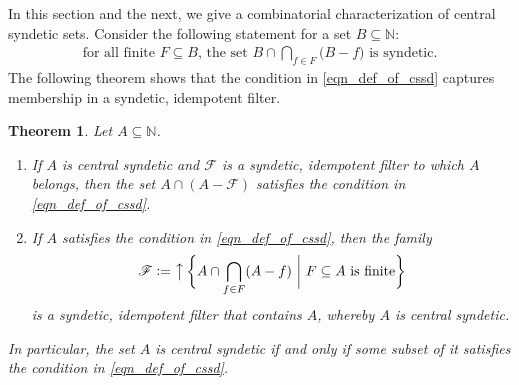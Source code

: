 \documentclass[letter,11pt]{article}
\theoremstyle{plain}
\newtheorem{theorem}{Theorem}
\theoremstyle{definition}
\theoremstyle{plain}
\theoremstyle{plain}
\numberwithin{equation}{section}
\newcommand{\N}{\mathbb{N}}
\newcommand{\defeq}{\vcentcolon=}
\DeclareMathOperator{\bigupclose}{\big\uparrow}
\newcommand{\filter}{\mathscr{F}}
\begin{document}
In this section and the next, we give a combinatorial characterization of central syndetic sets.  Consider the following statement for a set $B \subseteq \N$:
\begin{align}
    \label{eqn_def_of_cssd}
    \text{for all finite $F \subseteq B$, \ the set } B \cap \bigcap_{f \in F} \big( B - f \big) \text{ is syndetic}.
\end{align}
The following theorem shows that the condition in \eqref{eqn_def_of_cssd} captures membership in a syndetic, idempotent filter.


\begin{theorem}
\label{thm_conditions_for_central_syndetic}
    Let $A \subseteq \N$.
    \begin{enumerate}
        \item \label{item_central_syndetic_implies_comb_condition}
        If $A$ is central syndetic and $\filter$ is a syndetic, idempotent filter to which $A$ belongs, then the set $A \cap (A-\filter)$ satisfies the condition in \eqref{eqn_def_of_cssd}.

        \item \label{item_comb_condition_implies_central_syndetic}
        If $A$ satisfies the condition in \eqref{eqn_def_of_cssd}, then the family
        \[\filter \defeq \bigupclose \bigg\{ A \cap \bigcap_{f \in F} (A - f) \ \bigg | \ F \subseteq A \text{ is finite} \bigg\}\]
        is a syndetic, idempotent filter that contains $A$, whereby $A$ is central syndetic.
    \end{enumerate}
    In particular, the set $A$ is central syndetic if and only if some subset of it satisfies the condition in \eqref{eqn_def_of_cssd}.
\end{theorem}
\end{document}
